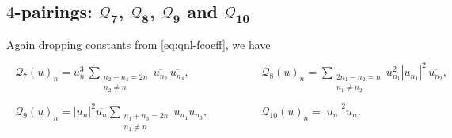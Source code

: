 \documentclass[11pt, xcolor = dvipsnames,reqno
]{amsart}
\theoremstyle{definition}
\theoremstyle{remark}
\begin{document}
    \subsection{$4$-pairings: $\boldsymbol{\mathcal{Q}_7}$, $\boldsymbol{\mathcal{Q}_8}$, $\boldsymbol{\mathcal{Q}_9}$ and $\boldsymbol{\mathcal{Q}_{10}}$}\label{sec:smoothing-4pairings} 
    Again dropping constants from \eqref{eq:qnl-fcoeff}, we have 
    \begin{align}
        \begin{array}{ll}
        & \\
        \mathcal{Q}_7(u)_n = u_n^3 \, \sum_{ \substack{ n_2 + n_4 = 2n \\ n_2 \neq n} } \overline{ u_{n_2} } \, \overline{ u_{n_4}},  & 
        \qquad \qquad \mathcal{Q}_8(u)_n = 
        \sum_{ \substack{ 2n_1 - n_2 = n \\ n_1 \neq n_2} } u_{n_1}^2 |u_{n_1}|^2 \, \overline{u_{n_2}}, \\
        & \\
       \mathcal{Q}_9(u)_n = 
        |u_n|^2 \overline{u_n} \sum_{ \substack{ n_1 + n_3 = 2n \\ n_1 \neq n } } u_{n_1} u_{n_3},  & \qquad \qquad \mathcal{Q}_{10}(u)_n = |u_n|^2 u_n. 
    \end{array}
    \end{align}
    
\end{document}
